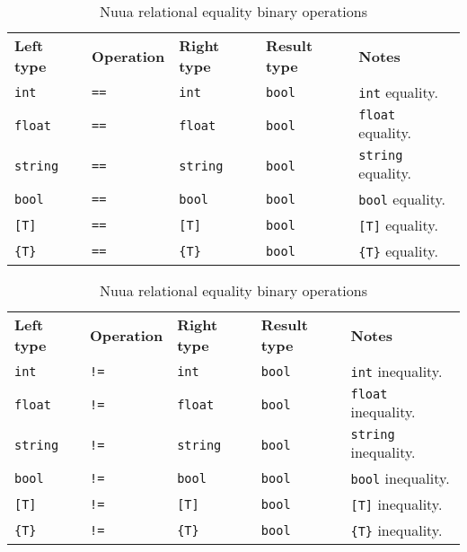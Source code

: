 \begin{table}[H]
    \centering
    \begin{subtable}{\textwidth}
        \centering
        \begin{tabular}{ l l l l p{9.5cm} }
            \textbf{Left type} & \textbf{Operation} & \textbf{Right type} & \textbf{Result type} & \textbf{Notes} \\
            \texttt{int} & \texttt{==} & \texttt{int} & \texttt{bool} & \texttt{int} equality.\\
            \texttt{float} & \texttt{==} & \texttt{float} & \texttt{bool} & \texttt{float} equality.\\
            \texttt{string} & \texttt{==} & \texttt{string} & \texttt{bool} & \texttt{string} equality.\\
            \texttt{bool} & \texttt{==} & \texttt{bool} & \texttt{bool} & \texttt{bool} equality.\\
            \texttt{[T]} & \texttt{==} & \texttt{[T]} & \texttt{bool} & \texttt{[T]} equality.\\
            \texttt{\{T\}} & \texttt{==} & \texttt{\{T\}} & \texttt{bool} & \texttt{\{T\}} equality.\\
        \end{tabular}
        \caption{Equality}
    \end{subtable}
    \begin{subtable}{\textwidth}
        \centering
        \begin{tabular}{ l l l l p{9.5cm} }
            \textbf{Left type} & \textbf{Operation} & \textbf{Right type} & \textbf{Result type} & \textbf{Notes} \\
            \texttt{int} & \texttt{!=} & \texttt{int} & \texttt{bool} & \texttt{int} inequality.\\
            \texttt{float} & \texttt{!=} & \texttt{float} & \texttt{bool} & \texttt{float} inequality.\\
            \texttt{string} & \texttt{!=} & \texttt{string} & \texttt{bool} & \texttt{string} inequality.\\
            \texttt{bool} & \texttt{!=} & \texttt{bool} & \texttt{bool} & \texttt{bool} inequality.\\
            \texttt{[T]} & \texttt{!=} & \texttt{[T]} & \texttt{bool} & \texttt{[T]} inequality.\\
            \texttt{\{T\}} & \texttt{!=} & \texttt{\{T\}} & \texttt{bool} & \texttt{\{T\}} inequality.\\
        \end{tabular}
        \caption{Inequality}
    \end{subtable}
    \caption{Nuua relational equality binary operations}
    \label{fig:nuua_relational_equality_bin_ops}
\end{table}

